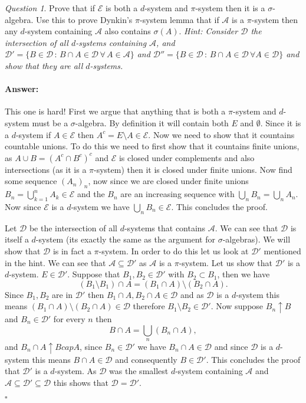 \documentclass[11pt]{article}
\theoremstyle{definition}
\theoremstyle{remark}
\newtheorem{q}{Question}
\newenvironment{ans}{\paragraph{Answer:}}{\hfill$\square$}
\begin{document}
\begin{q}
Prove that if $\mathcal{E}$ is both a $d$-system and $\pi$-system then it is a $\sigma$-algebra. Use this to prove Dynkin's $\pi$-system lemma that if $\mathcal{A}$ is a $\pi$-system then any $d$-system containing $\mathcal{A}$ also contains $\sigma(A)$. \emph{Hint: Consider $\mathcal{D}$ the intersection of all $d$-systems containing $\mathcal{A}$, and $\mathcal{D}' = \{B \in \mathcal{D}\,:\, B \cap A \in \mathcal{D} \, \forall \, A \in \mathcal{A}\}$ and $\mathcal{D}'' = \{ B \in \mathcal{D} \, :\, B \cap A \in \mathcal{D} \, \forall A \in \mathcal{D}\}$ and show that they are all $d$-systems.}
\end{q}
\begin{ans} This one is hard! First we argue that anything that is both a $\pi$-system and $d$-system must be a $\sigma$-algebra. By definition it will contain both $E$ and $\emptyset$. Since it is a $d$-system if $A \in \mathcal{E}$ then $A^c = E \setminus A \in \mathcal{E}$. Now we need to show that it countains countable unions. To do this we need to first show that it countains finite unions, as $A \cup B = (A^c \cap B^c)^c$ and $\mathcal{E}$ is closed under complements and also intersections (as it is a $\pi$-system) then it is closed under finite unions. Now find some sequence $(A_n)_n$, now since we are closed under finite unions $B_n = \bigcup_{k=1}^n A_k \in \mathcal{E}$ and the $B_n$ are an increasing sequence with $\bigcup_n B_n = \bigcup_n A_n$. Now since $\mathcal{E}$ is a $d$-system we have $\bigcup_n B_n \in \mathcal{E}$. This concludes the proof.

Let $\mathcal{D}$ be the intersection of all $d$-systems that contains $\mathcal{A}$. We can see that $\mathcal{D}$ is itself a $d$-system (its exactly the same as the argument for $\sigma$-algebras). We will show that $\mathcal{D}$ is in fact a $\pi$-system. In order to do this let us look at $\mathcal{D}'$ mentioned in the hint. We can see that $\mathcal{A} \subseteq \mathcal{D}'$ as $\mathcal{A}$ is a $\pi$-system. Let us show that $\mathcal{D}'$ is a $d$-system. $E \in \mathcal{D}'$. Suppose that $B_1, B_2 \in \mathcal{D}'$  with $B_2 \subset B_1$, then we have
\[ (B_1 \setminus B_1) \cap A = (B_1 \cap A) \setminus (B_2 \cap A). \] Since $B_1, B_2$ are in $\mathcal{D}'$ then $B_1 \cap A, B_2 \cap A \in \mathcal{D}$ and as $\mathcal{D}$ is a $d$-system this means $(B_1 \cap A) \setminus (B_2 \cap A) \in \mathcal{D}$ therefore $B_1 \setminus B_2 \in \mathcal{D}'$. Now suppose $B_n \uparrow B$ and $B_n \in \mathcal{D}'$ for every $n$ then
\[ B\cap A = \bigcup_n (B_n \cap A), \] and $B_n \cap A \uparrow B cap A$, since $B_n \in \mathcal{D}'$ we have $B_n \cap A \in \mathcal{D}$ and since $\mathcal{D}$ is a $d$-system this means $B \cap A \in \mathcal{D}$ and consequently $B \in \mathcal{D}'$. This concludes the proof that $\mathcal{D}'$ is a $d$-system. As $\mathcal{D}$ was the smallest $d$-system containing $\mathcal{A}$ and $\mathcal{A} \subseteq \mathcal{D}' \subseteq \mathcal{D}$ this shows that $\mathcal{D} = \mathcal{D}'$.


\end{ans}
\end{document}
